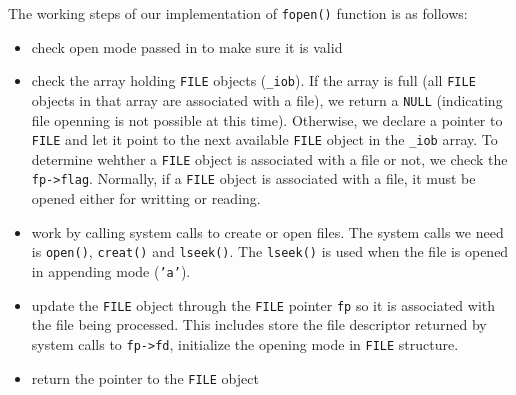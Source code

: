 \documentclass[12pt]{article}
\begin{document}
The working steps of our implementation of \texttt{fopen()} function is as follows:
\begin{itemize}
\item check open mode passed in to make sure it is valid
\item check the array holding \texttt{FILE} objects (\texttt{\_iob}). If the array is full (all \texttt{FILE} objects in that array are associated with a file), we return a \texttt{NULL} (indicating file openning is not possible at this time). Otherwise, we declare a pointer to \texttt{FILE} and let it point to the next available \texttt{FILE} object in the \texttt{\_iob} array. To determine wehther a \texttt{FILE} object is associated with a file or not, we check the \texttt{fp->flag}. Normally, if a \texttt{FILE} object is associated with a file, it must be opened either for writting or reading.
\item work by calling system calls to create or open files. The system calls we need is \texttt{open()}, \texttt{creat()} and \texttt{lseek()}. The \texttt{lseek()} is used when the file is opened in appending mode (\texttt{'a'}).
\item update the \texttt{FILE} object through the \texttt{FILE} pointer \texttt{fp} so it is associated with the file being processed. This includes store the file descriptor returned by system calls to \texttt{fp->fd}, initialize the opening mode in \texttt{FILE} structure.
\item return the pointer to the \texttt{FILE} object
\end{itemize}
\end{document}
